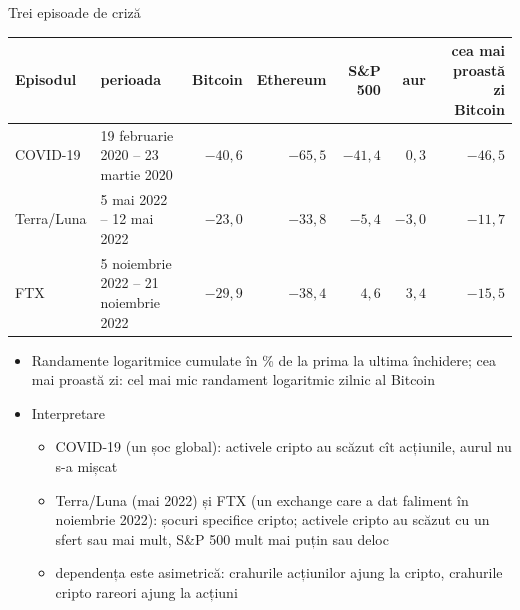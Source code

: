 \begin{frame}{Trei episoade de criză}
\itemsize{\footnotesize}
\begin{center}
\scriptsize
\begin{tabular}{llrrrrr}
\toprule
Episodul & perioada & Bitcoin & Ethereum & S\&P 500 & aur & cea mai proastă zi Bitcoin \\
\midrule
COVID-19 & 19 februarie 2020 -- 23 martie 2020 & $-40{,}6$ & $-65{,}5$ & $-41{,}4$ & $0{,}3$ & $-46{,}5$ \\
Terra/Luna & 5 mai 2022 -- 12 mai 2022 & $-23{,}0$ & $-33{,}8$ & $-5{,}4$ & $-3{,}0$ & $-11{,}7$ \\
FTX & 5 noiembrie 2022 -- 21 noiembrie 2022 & $-29{,}9$ & $-38{,}4$ & $4{,}6$ & $3{,}4$ & $-15{,}5$ \\
\bottomrule
\end{tabular}
\end{center}
\begin{itemize}
    \item Randamente logaritmice cumulate în \% de la prima la ultima închidere; cea mai proastă zi: cel mai mic randament logaritmic zilnic al Bitcoin
    \item Interpretare
    \begin{itemize}
        \item COVID-19 (un șoc global): activele cripto au scăzut cît acțiunile, aurul nu s-a mișcat
        \item Terra/Luna (mai 2022) și FTX (un exchange care a dat faliment în noiembrie 2022): șocuri specifice cripto; activele cripto au scăzut cu un sfert sau mai mult, S\&P 500 mult mai puțin sau deloc
        \item dependența este asimetrică: crahurile acțiunilor ajung la cripto, crahurile cripto rareori ajung la acțiuni
    \end{itemize}
\end{itemize}
\end{frame}

